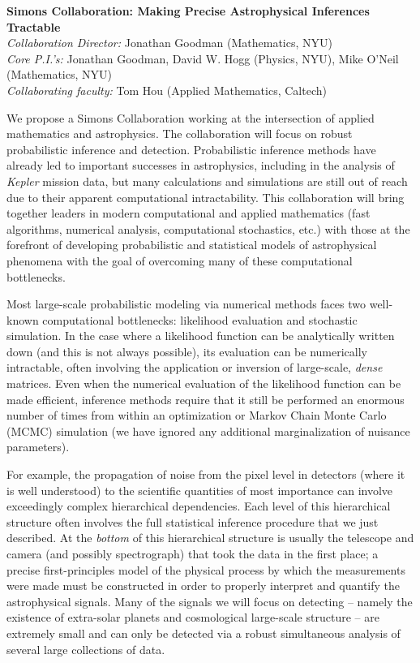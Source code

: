 \documentclass[12pt]{article}
\begin{document}
\sloppy\sloppypar\thispagestyle{empty}

\begin{center}
\textbf{Simons Collaboration: Making Precise Astrophysical Inferences
Tractable}\\
\textit{Collaboration Director:} Jonathan Goodman (Mathematics, NYU)\\
\textit{Core P.I.'s:} Jonathan Goodman, David W. Hogg (Physics, NYU), 
Mike O'Neil (Mathematics, NYU)\\
\textit{Collaborating faculty:} Tom Hou (Applied Mathematics, Caltech)
\end{center}
\bigskip

We propose a Simons Collaboration working at the intersection of applied
mathematics and astrophysics.
The collaboration will focus on robust probabilistic inference 
and detection.
Probabilistic inference methods have already led to important successes in
astrophysics, including in the analysis of {\em Kepler} mission data,
but many calculations and simulations are still out of reach due to their 
apparent computational intractability.
This collaboration will bring together leaders in
modern computational and applied mathematics (fast algorithms, numerical
analysis, computational stochastics, etc.) with those at the forefront of
developing probabilistic and statistical models of astrophysical
phenomena with the goal of overcoming many of these computational
bottlenecks.

Most large-scale probabilistic modeling via numerical
methods faces two well-known computational bottlenecks: likelihood
evaluation and stochastic simulation.
In the case where a likelihood function can be analytically written down
(and this is not always possible), its evaluation can be numerically
intractable, often involving the application or inversion of
large-scale, {\em dense} matrices.
Even when the numerical evaluation of the likelihood function can be
made efficient, inference methods require that it still be
performed an enormous number of times from within an optimization or
Markov Chain Monte Carlo (MCMC) simulation (we have ignored any
additional marginalization of nuisance parameters).

For example, the propagation of noise from the pixel level in detectors
(where it is well understood) to the scientific quantities of most
importance can involve exceedingly complex hierarchical dependencies.
Each level of this hierarchical structure often involves the full
statistical inference procedure that we just described.
At the {\em bottom} of this hierarchical structure is usually the
telescope and camera (and possibly spectrograph) that took the data in
the first place; a precise first-principles model of the physical
process by which the measurements were made must be constructed in order
to properly interpret and quantify the astrophysical signals.
Many of the signals we will focus on detecting -- namely the existence
of extra-solar planets and cosmological large-scale structure -- are
extremely small and can only be detected via a robust simultaneous
analysis of several large collections of data.
\end{document}
